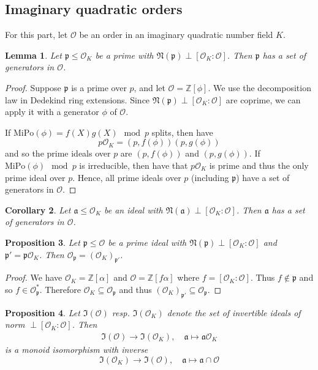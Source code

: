 \documentclass{ociamthesis}
\newcommand{\Z}{\mathbb{Z}}
\newcommand{\Norm}{\mathfrak{N}}
\renewcommand{\a}{\mathfrak{a}}
\newcommand{\p}{\mathfrak{p}}
\renewcommand{\O}{\mathcal{O}}
\newtheorem{prop}{Proposition}[section]
\newtheorem{lemma}[prop]{Lemma}
\newtheorem{corollary}[prop]{Corollary}
\theoremstyle{definition}
\begin{document}
\subsection{Imaginary quadratic orders}
For this part, let $\O$ be an order in an imaginary quadratic number field $K$.
\begin{lemma}
    Let $\p \leq \O_K$ be a prime with $\Norm(\p) \perp [\O_K : \O]$.
    Then $\p$ has a set of generators in $\O$.
\end{lemma}
\begin{proof}
    Suppose $\p$ is a prime over $p$, and let $\O = \Z[\phi]$.
    We use the decomposition law in Dedekind ring extensions.
    Since $\Norm(\p) \perp [\O_K : \O]$ are coprime, we can apply it with a generator $\phi$ of $\O$.

    If $\mathrm{MiPo}(\phi) = f(X)g(X) \mod p$ splits, then have
    \begin{equation*}
        p\O_K = (p, f(\phi))(p, g(\phi))
    \end{equation*}
    and so the prime ideals over $p$ are $(p, f(\phi))$ and $(p, g(\phi))$.
    If $\mathrm{MiPo}(\phi) \mod p$ is irreducible, then have that $p\O_K$ is prime and thus the only prime ideal over $p$.
    Hence, all prime ideals over $p$ (including $\p$) have a set of generators in $\O$.
\end{proof}
\begin{corollary}
    \label{prop:generators_in_order}
    Let $\a \leq \O_K$ be an ideal with $\Norm(\a) \perp [\O_K : \O]$. Then $\a$ has a set of generators in $\O$.
\end{corollary}
\begin{prop}
    Let $\p \leq \O$ be a prime ideal with $\Norm(\p) \perp [\O_K : \O]$ and $\p' = \p\O_K$.
    Then $\O_\p = (\O_K)_{\p'}$.
\end{prop}
\begin{proof}
    We have $\O_K = \Z[\alpha]$ and $\O = \Z[f\alpha]$ where $f = [\O_K : \O]$.
    Thus $f \notin \p$ and so $f \in \O_\p^*$.
    Therefore $\O_K \subseteq \O_\p$ and thus $(\O_K)_{\p'} \subseteq \O_\p$.
\end{proof}
\begin{prop}
    \label{prop:coprime_ideals_order}
    Let $\mathfrak{I}(\O)$ resp. $\mathfrak{I}(\O_K)$ denote the set of invertible ideals of norm $\perp [\O_K : \O]$.
    Then
    \begin{align*}
        \mathfrak{I}(\O) \to \mathfrak{I}(\O_K), \quad \a \mapsto \a\O_K
    \end{align*}
    is a monoid isomorphism with inverse
    \begin{equation*}
        \mathfrak{I}(\O_K) \to \mathfrak{I}(\O), \quad \a \mapsto \a \cap \O
    \end{equation*}
\end{prop}
\end{document}
